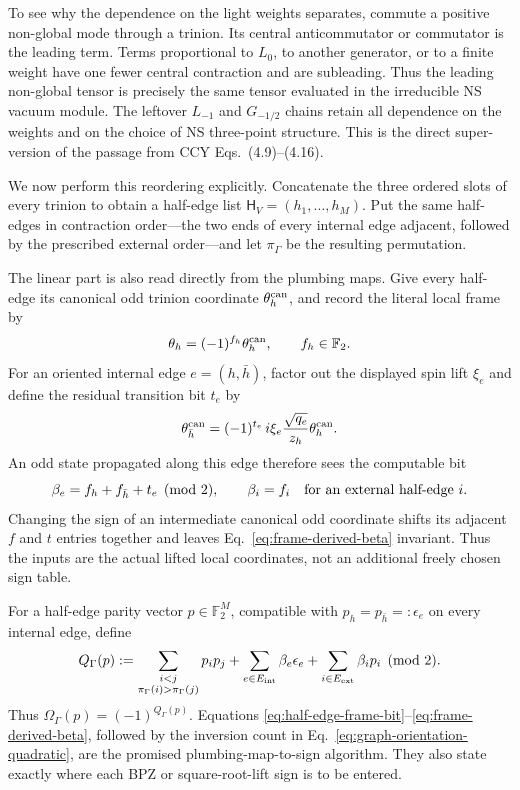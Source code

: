 \documentclass[11pt]{article}
\begin{document}
To see why the dependence on the light weights separates, commute a
positive non-global mode through a trinion.  Its central anticommutator or
commutator is the leading term.  Terms proportional to \(L_0\), to another
generator, or to a finite weight have one fewer central contraction and
are subleading.  Thus the leading non-global tensor is precisely the same
tensor evaluated in the irreducible NS vacuum module.  The leftover
\(L_{-1}\) and \(G_{-1/2}\) chains retain all dependence on the weights and
on the choice of NS three-point structure.  This is the direct super-version
of the passage from CCY Eqs.~(4.9)--(4.16).

We now perform this reordering explicitly.  Concatenate the three ordered
slots of every trinion to obtain a half-edge list
\(\mathsf H_V=(h_1,\ldots,h_M)\).  Put the same half-edges in contraction
order---the two ends of every internal edge adjacent, followed by the
prescribed external order---and let \(\pi_\Gamma\) be the resulting
permutation.

The linear part is also read directly from the plumbing maps.  Give every
half-edge its canonical odd trinion coordinate \(\theta_h^{\rm can}\), and
record the literal local frame by
\begin{equation}
 \theta_h=(-1)^{f_h}\theta_h^{\rm can},
 \qquad f_h\in\mathbb F_2.
 \label{eq:half-edge-frame-bit}
\end{equation}
For an oriented internal edge \(e=(h,\bar h)\), factor out the displayed
spin lift \(\xi_e\) and define the residual transition bit \(t_e\) by
\begin{equation}
 \theta_{\bar h}^{\rm can}
 =(-1)^{t_e}\,i\xi_e\frac{\sqrt{q_e}}{z_h}
  \theta_h^{\rm can}.
 \label{eq:edge-transition-bit}
\end{equation}
An odd state propagated along this edge therefore sees the computable bit
\begin{equation}
 \beta_e=f_h+f_{\bar h}+t_e\pmod2,
 \qquad
 \beta_i=f_i\quad\hbox{for an external half-edge }i.
 \label{eq:frame-derived-beta}
\end{equation}
Changing the sign of an intermediate canonical odd coordinate shifts its
adjacent \(f\) and \(t\) entries together and leaves
Eq.~\eqref{eq:frame-derived-beta} invariant.  Thus the inputs are the actual
lifted local coordinates, not an additional freely chosen sign table.

For a half-edge parity vector \(p\in\mathbb F_2^M\), compatible with
\(p_h=p_{\bar h}=:\epsilon_e\) on every internal edge, define
\begin{equation}
 Q_\Gamma(p)
 :=\sum_{\substack{i<j\\
       \pi_\Gamma(i)>\pi_\Gamma(j)}}p_i p_j
   +\sum_{e\in E_{\rm int}}\beta_e\epsilon_e
   +\sum_{i\in E_{\rm ext}}\beta_i p_i
   \pmod2.
 \label{eq:graph-orientation-quadratic}
\end{equation}
Thus \(\Omega_\Gamma(p)=(-1)^{Q_\Gamma(p)}\).  Equations
\eqref{eq:half-edge-frame-bit}--\eqref{eq:frame-derived-beta}, followed by the
inversion count in Eq.~\eqref{eq:graph-orientation-quadratic}, are the promised
plumbing-map-to-sign algorithm.  They also state exactly where each BPZ or
square-root-lift sign is to be entered.
\end{document}
